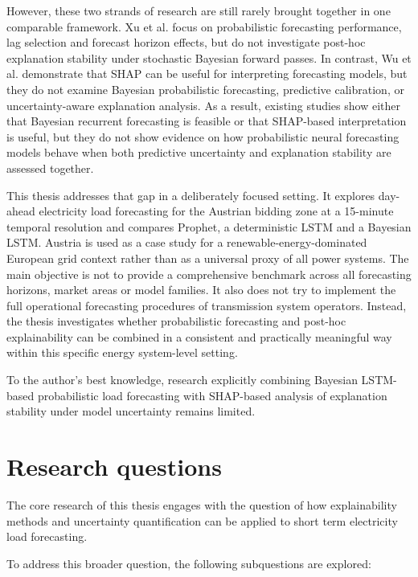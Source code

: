 \documentclass[Master,english,IEEE]{twbook}
\begin{document}
However, these two strands of research are still rarely brought together in one comparable framework. Xu et al. focus on probabilistic forecasting performance, lag selection and forecast horizon effects, but do not investigate post-hoc explanation stability under stochastic Bayesian forward passes. In contrast, Wu et al. demonstrate that SHAP can be useful for interpreting forecasting models, but they do not examine Bayesian probabilistic forecasting, predictive calibration, or uncertainty-aware explanation analysis. As a result, existing studies show either that Bayesian recurrent forecasting is feasible or that SHAP-based interpretation is useful, but they do not show evidence on how probabilistic neural forecasting models behave when both predictive uncertainty and explanation stability are assessed together.

This thesis addresses that gap in a deliberately focused setting. It explores day-ahead electricity load forecasting for the Austrian bidding zone at a 15-minute temporal resolution and compares Prophet, a deterministic LSTM and a Bayesian LSTM. Austria is used as a case study for a renewable-energy-dominated European grid context rather than as a universal proxy of all power systems. The main objective is not to provide a comprehensive benchmark across all forecasting horizons, market areas or model families. It also does not try to implement the full operational forecasting procedures of transmission system operators. Instead, the thesis investigates whether probabilistic forecasting and post-hoc explainability can be combined in a consistent and practically meaningful way within this specific energy system-level setting.

To the author's best knowledge, research explicitly combining Bayesian LSTM-based probabilistic load forecasting with SHAP-based analysis of explanation stability under model uncertainty remains limited.

\section{Research questions}

The core research of this thesis engages with the question of how explainability methods and uncertainty quantification can be applied to short term electricity load forecasting. 

To address this broader question, the following subquestions are explored:
\end{document}
